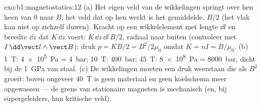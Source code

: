 \begin{solution}{exo:b1:magnetostatics:12}
(a) Het eigen veld van de wikkelingen springt over hen heen van $0$ naar $B$; het
veld dat op hen werkt is het gemiddelde, $B/2$ (het vlak kan niet op
zichzelf duwen). Kracht op een wikkelelement met lengte $\dd l$ en breedte $\dd z$
dat $K\,\dd z$ voert: $K\,\dd z\,\dd l\,B/2$, radiaal naar buiten (controleer met $I\,\dd\vect l
\wedge\vect B$): druk $p = KB/2 = B^2/2\mu_0$ omdat $K = nI = B/\mu_0$.
(b) \qty{1}{T}: \qty{4e5}{Pa} = \qty{4}{bar}; \qty{10}{T}: \qty{400}{bar}; \qty{45}{T}:
\qty{8e8}{Pa} = \qty{8000}{bar}, dicht bij de \qty{1}{GPa} van staal. (c) De
wikkelingen moeten een druk weerstaan die als $B^2$ groeit: boven ongeveer \qty{40}{T}
is geen materiaal en geen koelschema meer opgewassen --- de grens van stationaire magneten
is mechanisch (en, bij supergeleiders, hun kritische veld).
\end{solution}

